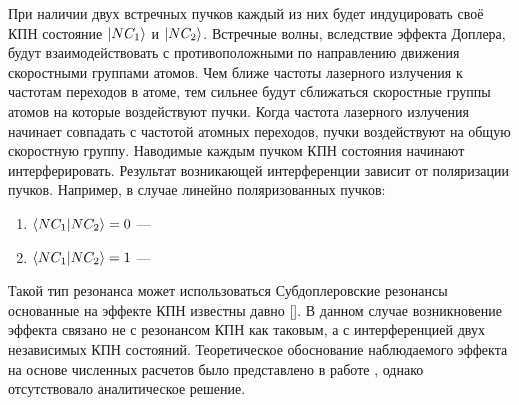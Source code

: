 При наличии двух встречных пучков каждый из них будет индуцировать своё КПН состояние $\ket{NC_1}$ и $\ket{NC_2}$.
Встречные волны, вследствие эффекта Доплера, будут взаимодействовать с противоположными по направлению движения скоростными группами атомов.
Чем ближе частоты лазерного излучения к частотам переходов в атоме, тем сильнее будут сближаться скоростные группы атомов на которые воздействуют пучки.
Когда частота лазерного излучения начинает совпадать с частотой атомных переходов, пучки воздействуют на общую скоростную группу.
Наводимые каждым пучком КПН состояния начинают интерферировать.
Результат возникающей интерференции зависит от поляризации пучков. 
Например, в случае линейно поляризованных пучков:
\begin{enumerate}[beginpenalty=10000]
    \item $\braket{NC_1|NC_2}=0$ ---
    \item $\braket{NC_1|NC_2}=1$ ---
\end{enumerate}
Такой тип резонанса может использоваться
Субдоплеровские резонансы основанные на эффекте КПН известны давно []. 
В данном случае возникновение эффекта связано не с резонансом КПН как таковым, а с интерференцией двух независимых КПН состояний.
Теоретическое обоснование наблюдаемого эффекта на основе численных расчетов было представлено в работе \autocite{hafiz2017}, однако отсутствовало аналитическое решение.

\ifsynopsis
\else
\fi


